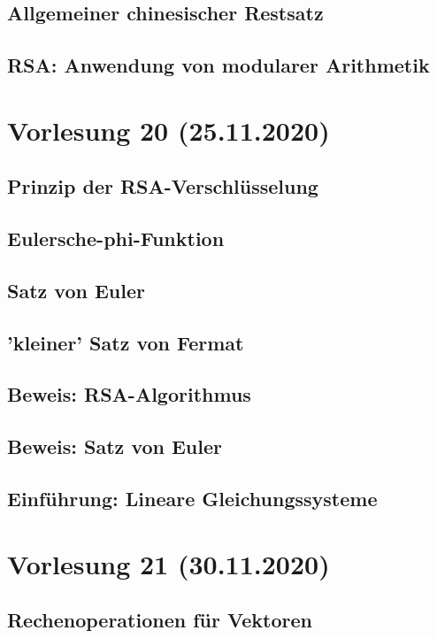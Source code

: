 \documentclass[]{article}
\begin{document}
\subsection{Allgemeiner chinesischer Restsatz}
\subsection{RSA: Anwendung von modularer Arithmetik}


\section{Vorlesung 20 (25.11.2020)}
\subsection{Prinzip der RSA-Verschlüsselung}
\subsection{Eulersche-phi-Funktion}
\subsection{Satz von Euler}
\subsection{'kleiner' Satz von Fermat}
\subsection{Beweis: RSA-Algorithmus}
\subsection{Beweis: Satz von Euler}
\subsection{Einführung: Lineare Gleichungssysteme}


\section{Vorlesung 21 (30.11.2020)}
\subsection{Rechenoperationen für Vektoren}
\end{document}
